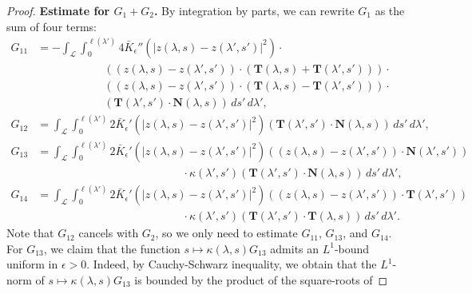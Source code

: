 \documentclass[reqno,centertags,12pt]{amsart}
\theoremstyle{definition}
\numberwithin{equation}{section}
\newcommand{\abs}[1]{\left\lvert#1\right\rvert}
\begin{document}
\begin{proof}
    \textbf{Estimate for $G_{1}+G_{2}$.} By integration by parts, we can rewrite $G_{1}$
    as the sum of four terms:
    \begin{align*}
        G_{11}&= -\int_{\mathcal{L}}\int_{0}^{\ell(\lambda')}
        4\bar{K}_{\epsilon}''\left(\abs{z(\lambda,s) - z(\lambda',s')}^{2}\right)\cdot
        \\&\quad\quad\quad\quad\quad\quad
        \left((z(\lambda,s) - z(\lambda',s'))
        \cdot(\mathbf{T}(\lambda,s)+\mathbf{T}(\lambda',s'))\right)\cdot
        \\&\quad\quad\quad\quad\quad\quad
        \left((z(\lambda,s) - z(\lambda',s'))
        \cdot(\mathbf{T}(\lambda,s)-\mathbf{T}(\lambda',s'))\right)\cdot
        \\&\quad\quad\quad\quad\quad\quad
        \left(\mathbf{T}(\lambda',s')\cdot\mathbf{N}(\lambda,s)\right)\,ds'\,d\lambda',\\
        G_{12}&= \int_{\mathcal{L}}\int_{0}^{\ell(\lambda')}
        2\bar{K}_{\epsilon}'\left(\abs{z(\lambda,s) - z(\lambda',s')}^{2}\right)
        \left(\mathbf{T}(\lambda',s')\cdot\mathbf{N}(\lambda,s)\right)\,ds'\,d\lambda',\\
        G_{13}&= \int_{\mathcal{L}}\int_{0}^{\ell(\lambda')}
        2\bar{K}_{\epsilon}'\left(\abs{z(\lambda,s) - z(\lambda',s')}^{2}\right)
        \left((z(\lambda,s) - z(\lambda',s'))\cdot\mathbf{N}(\lambda',s')\right)
        \\&\quad\quad\quad\quad\quad\quad\quad\quad\quad\quad\quad\quad\quad
        \cdot\kappa(\lambda',s')
        \left(\mathbf{T}(\lambda',s')\cdot\mathbf{N}(\lambda,s)\right)\,ds'\,d\lambda',\\
        G_{14}&= \int_{\mathcal{L}}\int_{0}^{\ell(\lambda')}
        2\bar{K}_{\epsilon}'\left(\abs{z(\lambda,s) - z(\lambda',s')}^{2}\right)
        \left((z(\lambda,s) - z(\lambda',s'))\cdot\mathbf{T}(\lambda',s')\right)
        \\&\quad\quad\quad\quad\quad\quad\quad\quad\quad\quad\quad\quad\quad
        \cdot\kappa(\lambda',s')
        \left(\mathbf{T}(\lambda',s')\cdot\mathbf{T}(\lambda,s)\right)\,ds'\,d\lambda'.
    \end{align*}
    Note that $G_{12}$ cancels with $G_{2}$, so we only need to estimate
    $G_{11}$, $G_{13}$, and $G_{14}$. For $G_{13}$, we claim that the function
    $s\mapsto \kappa(\lambda,s)G_{13}$ admits an $L^{1}$-bound uniform in $\epsilon>0$.
    Indeed, by Cauchy-Schwarz inequality, we obtain that the $L^{1}$-norm of
    $s\mapsto\kappa(\lambda,s)G_{13}$ is bounded by the product of the square-roots of

\end{proof}
\end{document}
